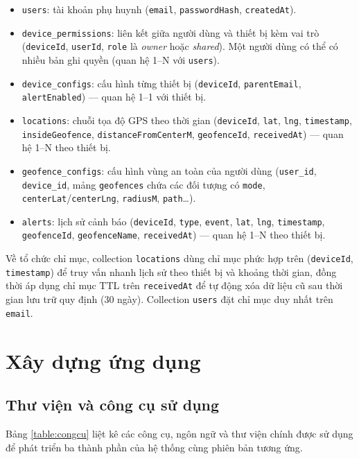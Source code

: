 \documentclass[../DoAn.tex]{subfiles}
\begin{document}
    \begin{itemize}
        \item \texttt{users}: tài khoản phụ huynh (\texttt{email}, \texttt{passwordHash}, \texttt{createdAt}).
        \item \texttt{device\_permissions}: liên kết giữa người dùng và thiết bị kèm vai trò (\texttt{deviceId}, \texttt{userId}, \texttt{role} là \textit{owner} hoặc \textit{shared}). Một người dùng có thể có nhiều bản ghi quyền (quan hệ 1--N với \texttt{users}).
        \item \texttt{device\_configs}: cấu hình từng thiết bị (\texttt{deviceId}, \texttt{parentEmail}, \texttt{alertEnabled}) — quan hệ 1--1 với thiết bị.
        \item \texttt{locations}: chuỗi tọa độ GPS theo thời gian (\texttt{deviceId}, \texttt{lat}, \texttt{lng}, \texttt{timestamp}, \texttt{insideGeofence}, \texttt{distanceFromCenterM}, \texttt{geofenceId}, \texttt{receivedAt}) — quan hệ 1--N theo thiết bị.
        \item \texttt{geofence\_configs}: cấu hình vùng an toàn của người dùng (\texttt{user\_id}, \texttt{device\_id}, mảng \texttt{geofences} chứa các đối tượng có \texttt{mode}, \texttt{centerLat}/\texttt{centerLng}, \texttt{radiusM}, \texttt{path}\dots).
        \item \texttt{alerts}: lịch sử cảnh báo (\texttt{deviceId}, \texttt{type}, \texttt{event}, \texttt{lat}, \texttt{lng}, \texttt{timestamp}, \texttt{geofenceId}, \texttt{geofenceName}, \texttt{receivedAt}) — quan hệ 1--N theo thiết bị.
    \end{itemize}

    Về tổ chức chỉ mục, collection \texttt{locations} dùng chỉ mục phức hợp trên (\texttt{deviceId}, \texttt{timestamp}) để truy vấn nhanh lịch sử theo thiết bị và khoảng thời gian, đồng thời áp dụng chỉ mục TTL trên \texttt{receivedAt} để tự động xóa dữ liệu cũ sau thời gian lưu trữ quy định (30 ngày). Collection \texttt{users} đặt chỉ mục duy nhất trên \texttt{email}.

    \section{Xây dựng ứng dụng}

    \subsection{Thư viện và công cụ sử dụng}

    Bảng \ref{table:congcu} liệt kê các công cụ, ngôn ngữ và thư viện chính được sử dụng để phát triển ba thành phần của hệ thống cùng phiên bản tương ứng.
\end{document}
